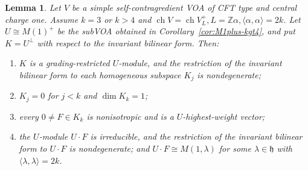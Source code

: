\documentclass[10pt,a4paper]{amsart}
\numberwithin{equation}{section} \newtheorem{thm}{Theorem}[section] \newtheorem{lem}[thm]{Lemma} \newtheorem{ex}[thm]{Example} \newtheorem{prop}[thm]{Proposition} \newtheorem{cor}[thm]{Corollary} \newtheorem{defi}[thm]{Definition} \newtheorem{rmk}[thm]{Remark} \newtheorem{notation}[thm]{Notation}
\newcommand{\ch}{\operatorname{ch}}
\def\Z{\mathbb{Z}} \def\N{\mathbb{N}} \def\A{\mathbb{A}} \def\C{\mathbb{C}} \def\R{\mathbb{R}} \def\Q{\mathbb{Q}} \def\F{\mathbb{F}}
\begin{document}
\begin{lem}\label{lem:first-lattice}
Let $V$ be a simple self-contragredient VOA of CFT type and central charge one. Assume $k=3$ or $k>4$ and \(\ch V=\ch V_L^+, L=\Z\alpha,\langle\alpha,\alpha\rangle=2k\). Let \(U\cong M(1)^+\) be the subVOA obtained in Corollary~\ref{cor:M1plus-kgt4}, and put $K=U^\perp$ with respect to the invariant bilinear form. Then:
\begin{enumerate}[label=(\roman*),leftmargin=2.1em]
\item $K$ is a grading-restricted $U$-module, and the restriction of the invariant bilinear form to each homogeneous subspace $K_j$ is nondegenerate;
\item $K_j=0$ for $j<k$ and $\dim K_k=1$;
\item every $0\ne F\in K_k$ is nonisotropic and is a $U$-highest-weight vector;
\item the $U$-module $U\cdot F$ is irreducible, and the restriction of the
invariant bilinear form to $U\cdot F$ is nondegenerate; and \(U\cdot F\cong M(1,\lambda)\) for some $\lambda\in\mathfrak h$ with \(\langle\lambda,\lambda\rangle=2k\).
\end{enumerate}
\end{lem}
\end{document}
